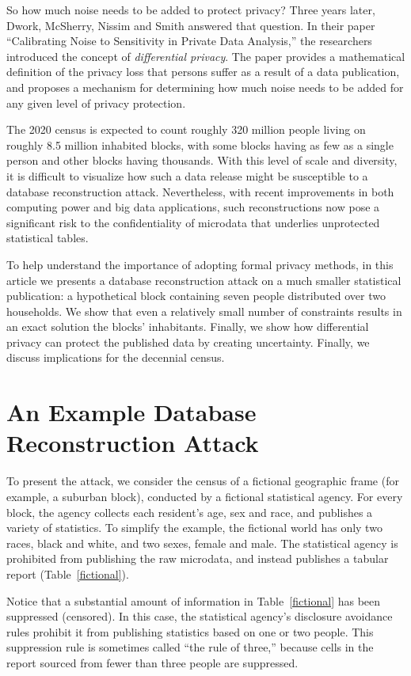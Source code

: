 \documentclass[runningheads]{llncs}
\begin{document}
So how much noise needs to be added to protect privacy? Three years
later, Dwork, McSherry, Nissim and Smith answered that question. In
their paper ``Calibrating Noise to Sensitivity in Private Data
Analysis,''\cite{Dwork:2006:CNS:2180286.2180305} the researchers
introduced the concept of \emph{differential privacy}. The paper
provides a mathematical definition of the privacy loss that
persons suffer as a result of a data publication, and proposes a
mechanism for determining how much noise needs to be added for any
given level of privacy protection.

The 2020 census is expected to count roughly 320 million people living
on roughly 8.5 million inhabited blocks, with some blocks having as
few as a single person and other blocks having thousands. With this
level of scale and diversity, it is difficult to visualize how such a
data release might be susceptible to a database reconstruction
attack. Nevertheless, with recent improvements in both computing power
and big data applications, such reconstructions now pose a significant
risk to the confidentiality of microdata that underlies unprotected
statistical tables.

To help understand the importance of adopting formal privacy methods, in
this article we presents a database reconstruction attack on a much
smaller statistical publication: a hypothetical block containing seven
people distributed over two households. We show that even a relatively
small number of constraints results in an exact solution the blocks'
inhabitants. Finally, we show how differential privacy can protect the
published data by creating uncertainty. Finally, we discuss
implications for the decennial census.

\section{An Example Database Reconstruction Attack}

To present the attack, we consider the 
census of a fictional geographic frame (for example, a suburban block),
conducted by a fictional statistical
agency. For every block, the agency collects each resident's age,
sex and race, and publishes a variety of statistics. To simplify the example,
the fictional world has only two races, black and white, and two
sexes, female and male. The statistical agency
is prohibited from publishing the raw microdata, and instead publishes
a tabular report (Table~\ref{fictional}). 

Notice that a substantial amount of information in
Table~\ref{fictional} has been suppressed (censored). In this case,
the statistical agency's disclosure avoidance rules prohibit it from
publishing statistics based on one or two people. This suppression rule is
sometimes called ``the rule of three,'' because cells in the report
sourced from fewer than three people are suppressed.
\end{document}

